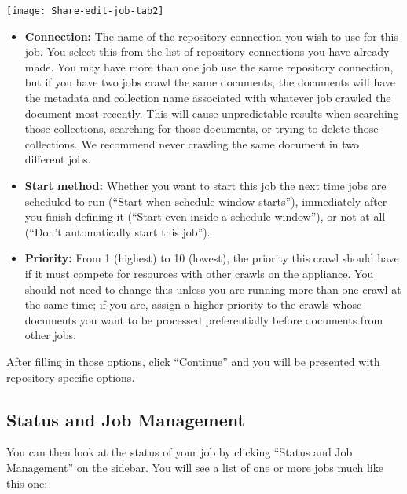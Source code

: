 \begin{changemargin}{1.5in}{0in}
\begin{itemize}
\end{itemize}

\texttt{[image: Share-edit-job-tab2]}

\begin{itemize}

\item \textbf{Connection:} The name of the repository connection you
wish to use for this job. You select this from the list of repository
connections you have already made. You may have more than one job use
the same repository connection, but if you have two jobs crawl the same
documents, the documents will have the metadata and collection name
associated with whatever job crawled the document most recently. This
will cause unpredictable results when searching those collections,
searching for those documents, or trying to delete those collections.
We recommend never crawling the same document in two different jobs.

\item \textbf{Start method:} Whether you want to start this job the next
time jobs are scheduled to run (``Start when schedule window starts''),
immediately after you finish defining it (``Start even inside a schedule
window''), or not at all (``Don't automatically start this job'').

\item \textbf{Priority:} From 1 (highest) to 10 (lowest), the priority
this crawl should have if it must compete for resources with other
crawls on the appliance. You should not need to change this unless you
are running more than one crawl at the same time; if you are, assign a
higher priority to the crawls whose documents you want to be processed
preferentially before documents from other jobs.

\end{itemize}


After filling in those options, click ``Continue'' and you will be
presented with repository-specific options.



\subsection{\label{ManageJobs}Status and Job Management}

You can then look at the status of your job by clicking ``Status and 
Job Management'' on the sidebar. You will see a list of one or more jobs
much like this one:


\end{changemargin}
